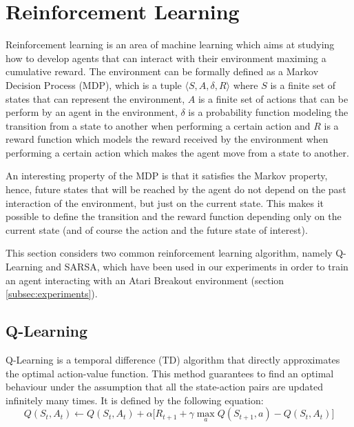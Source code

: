 \section{Reinforcement Learning}
\label{section:rl}
Reinforcement learning \cite{Suttonrl18} is an area of machine learning
which aims at studying how to develop agents that can interact with
their environment maximing a cumulative reward. The environment can be
formally defined as a Markov Decision Process (MDP), which is a tuple
$\langle S, A, \delta, R \rangle$ where $S$ is a finite set of states that can represent
the environment, $A$ is a finite set of actions that can be perform by
an agent in the environment, $\delta$ is a probability function modeling
the transition from a state to another when performing a certain action and
$R$ is a reward function which models the reward received by the environment
when performing a certain action which makes the agent move from a state
to another.

An interesting property of the MDP is that it satisfies the Markov property,
hence, future states that will be reached by the agent do not depend
on the past interaction of the environment, but just on the current state.
This makes it possible to define the transition and the reward function
depending only on the current state (and of course the action and the future
state of interest).

This section considers two common reinforcement learning algorithm,
namely Q-Learning and SARSA, which have been used in our experiments
in order to train an agent interacting with an Atari Breakout environment
(section \ref{subsec:experiments}).

\subsection{Q-Learning}
Q-Learning is a temporal difference (TD) algorithm that directly approximates
the optimal action-value
function. This method guarantees to find an optimal behaviour under the
assumption that all the state-action pairs are updated infinitely many times. It is
defined \cite{Suttonrl18} by the following equation:
\begin{equation}
    \label{eq:qlearning-update-function}
    Q(S_t, A_t) \leftarrow Q(S_t, A_t) + \alpha \Big[ R_{t+1} +
        \gamma \max_{a} Q(S_{t+1}, a) - Q(S_t, A_t) \Big]
\end{equation}

